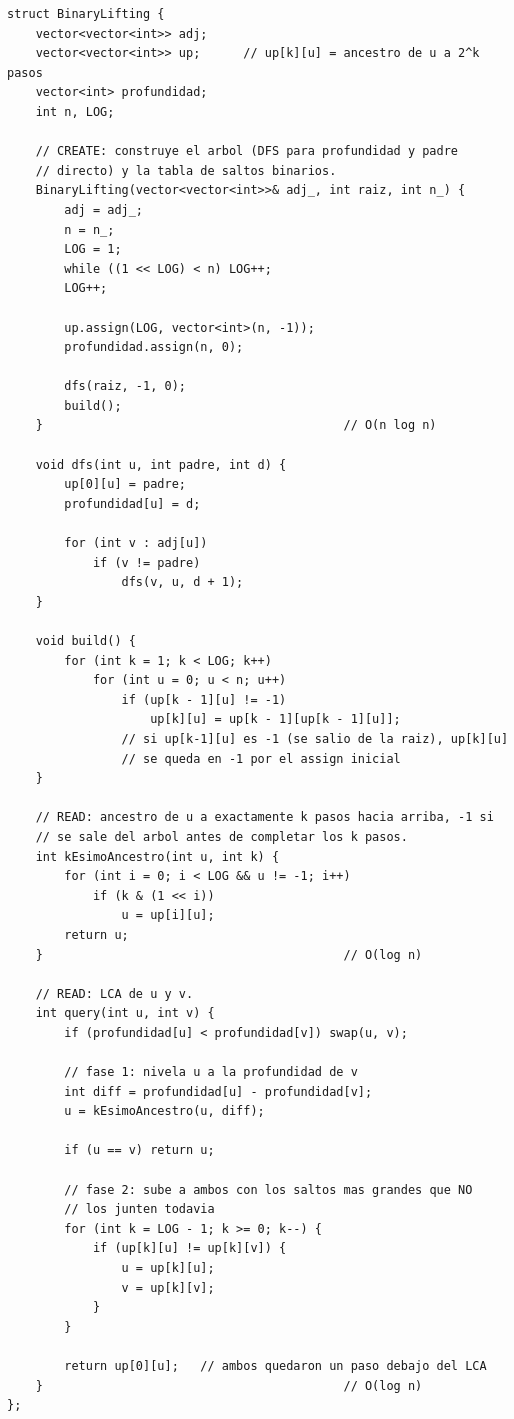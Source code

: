 \documentclass[10pt,a4paper,twocolumn]{article}
\begin{document}
\begin{lstlisting}[style=cpp]
struct BinaryLifting {
    vector<vector<int>> adj;
    vector<vector<int>> up;      // up[k][u] = ancestro de u a 2^k pasos
    vector<int> profundidad;
    int n, LOG;

    // CREATE: construye el arbol (DFS para profundidad y padre
    // directo) y la tabla de saltos binarios.
    BinaryLifting(vector<vector<int>>& adj_, int raiz, int n_) {
        adj = adj_;
        n = n_;
        LOG = 1;
        while ((1 << LOG) < n) LOG++;
        LOG++;

        up.assign(LOG, vector<int>(n, -1));
        profundidad.assign(n, 0);

        dfs(raiz, -1, 0);
        build();
    }                                          // O(n log n)

    void dfs(int u, int padre, int d) {
        up[0][u] = padre;
        profundidad[u] = d;

        for (int v : adj[u])
            if (v != padre)
                dfs(v, u, d + 1);
    }

    void build() {
        for (int k = 1; k < LOG; k++)
            for (int u = 0; u < n; u++)
                if (up[k - 1][u] != -1)
                    up[k][u] = up[k - 1][up[k - 1][u]];
                // si up[k-1][u] es -1 (se salio de la raiz), up[k][u]
                // se queda en -1 por el assign inicial
    }

    // READ: ancestro de u a exactamente k pasos hacia arriba, -1 si
    // se sale del arbol antes de completar los k pasos.
    int kEsimoAncestro(int u, int k) {
        for (int i = 0; i < LOG && u != -1; i++)
            if (k & (1 << i))
                u = up[i][u];
        return u;
    }                                          // O(log n)

    // READ: LCA de u y v.
    int query(int u, int v) {
        if (profundidad[u] < profundidad[v]) swap(u, v);

        // fase 1: nivela u a la profundidad de v
        int diff = profundidad[u] - profundidad[v];
        u = kEsimoAncestro(u, diff);

        if (u == v) return u;

        // fase 2: sube a ambos con los saltos mas grandes que NO
        // los junten todavia
        for (int k = LOG - 1; k >= 0; k--) {
            if (up[k][u] != up[k][v]) {
                u = up[k][u];
                v = up[k][v];
            }
        }

        return up[0][u];   // ambos quedaron un paso debajo del LCA
    }                                          // O(log n)
};
\end{lstlisting}
\end{document}
